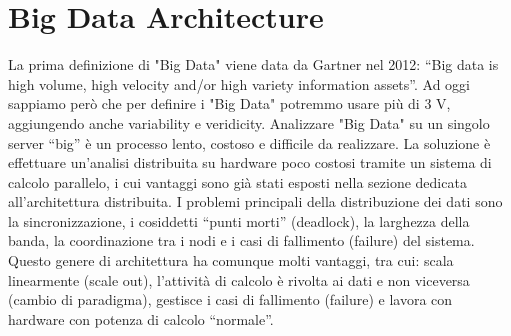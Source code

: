 \documentclass[a4page, 11pt]{article}
\begin{document}
\section{Big Data Architecture}
La prima definizione di "Big Data" viene data da Gartner nel 2012: “Big data is high volume, high velocity and/or high variety information assets”. Ad oggi sappiamo però che per definire i "Big Data" potremmo usare più di 3 V, aggiungendo anche variability e veridicity. Analizzare "Big Data" su un singolo server “big” è un processo lento, costoso e difficile da realizzare. La soluzione è effettuare un’analisi distribuita su hardware poco costosi tramite un sistema di calcolo parallelo, i cui vantaggi sono già stati esposti nella sezione dedicata all'architettura distribuita. I problemi principali della distribuzione dei dati sono la sincronizzazione, i cosiddetti “punti morti” (deadlock), la larghezza della banda, la coordinazione tra i nodi e i casi di fallimento (failure) del sistema. Questo genere di architettura ha comunque molti vantaggi, tra cui: scala linearmente (scale out), l’attività di calcolo è rivolta ai dati e non viceversa (cambio di paradigma), gestisce i casi di fallimento (failure) e lavora con hardware con potenza di calcolo “normale”.
\end{document}
